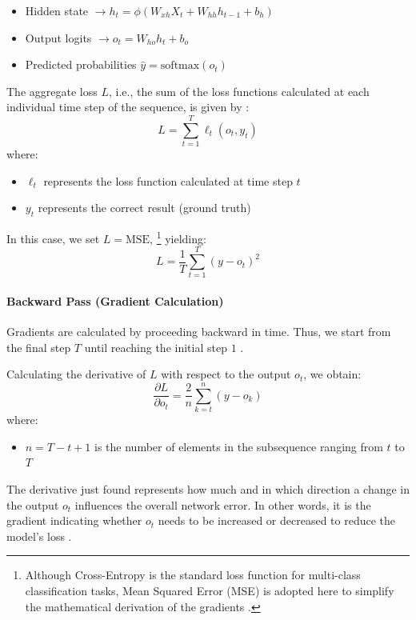 \begin{itemize}
\item Hidden state $\rightarrow h_t = \phi(W_{xh} X_t + W_{hh} h_{t-1} + b_h)$
\item Output logits $\rightarrow o_t=W_{ho}h_t+b_o$ %
\item Predicted probabilities $\hat{y}=\text{softmax}(o_t)$
\end{itemize}
The aggregate loss $L$, i.e., the sum of the loss functions calculated at each individual time step of the sequence, is given by \cite{quarkml-bptt}:
\begin{equation}
L =\sum^T_{t=1} \ell_t(o_t, y_t)
\end{equation}
where:
\begin{itemize}
\item $\ell_t$ represents the loss function calculated at time step $t$
\item $y_t$ represents the correct result (ground truth)
\end{itemize}

In this case, we set $L=\text{MSE}$, \footnote{Although Cross-Entropy is the standard loss function for multi-class classification tasks, Mean Squared Error (MSE) is adopted here to simplify the mathematical derivation of the gradients \cite{quarkml-bptt}.} yielding:
\begin{equation}
L = \frac{1}{T} \sum^T_{t=1}(y-o_t)^2
\end{equation}

\paragraph{Backward Pass (Gradient Calculation)}
Gradients are calculated by proceeding backward in time.
Thus, we start from the final step $T$ until reaching the initial step $1$ \cite{quarkml-bptt, cs231n-rnn}.

Calculating the derivative of $L$ with respect to the output $o_t$, we obtain:
\begin{equation}
\frac{\partial L}{\partial o_t} = \frac{2}{n}\sum^n_{k=t}(y-o_k) %
\end{equation}
where:
\begin{itemize}
\item $n = T-t+1$ is the number of elements in the subsequence ranging from $t$ to $T$
\end{itemize} \cite{quarkml-bptt}
The derivative just found represents how much and in which direction a change in the output $o_t$ influences the overall network error. In other words, it is the gradient indicating whether $o_t$ needs to be increased or decreased to reduce the model's loss \cite{medium_math_rnn}.

